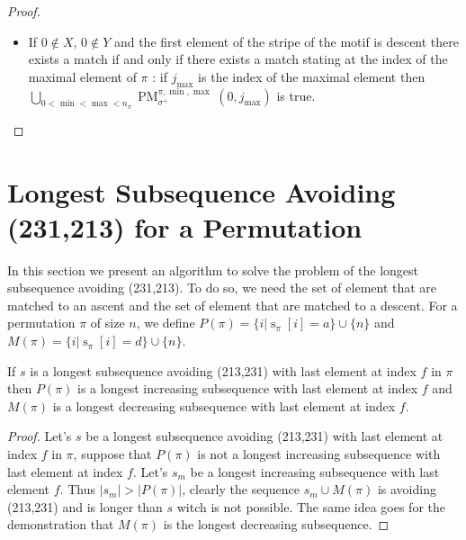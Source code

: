 \documentclass[a4paper]{llncs}
\newcommand{\ptext}{\pi}
\newcommand{\pmotif}{\sigma}
\DeclareMathOperator{\stripea}{s}
\newcommand{\stripe}[2]{\stripea_{{#1}}[{#2}]}
\newcommand{\dstep}{d}
\newcommand{\ustep}{a}
\newcommand{\x}{X}
\newcommand{\y}{Y}
\newcommand{\pbmotif}{\pmotif^+}
\DeclareMathOperator{\PMa}{PM}
\newcommand{\PM}[6]{\PMa_{{#1}}^{{#2},{#3},{#4}}({#5},{#6})}
\begin{document}
\begin{proof}
\begin{itemize}
	\item If $0 \notin \x$, $0 \notin \y$ and the first element of the stripe of the motif is descent there exists a match if and only if there exists a match stating at the index of the maximal element of $\ptext$ : if $j_{\max}$ is the index of the maximal element then  \\	$\bigcup_{0<\min<\max<n_\ptext}\PM{\pbmotif}{\ptext}{\min}{\max}{0}{j_{\max}}$ is true.	

\end{itemize}
\end{proof}



\section{Longest Subsequence Avoiding \\(231,213) for a Permutation}
\label{section:LCS}

	In this section we present an algorithm to solve the problem
	of the longest subsequence avoiding (231,213).
	To do so, we need the set of element
	that are matched to an ascent and the
	set of element that are matched to a descent.
	For a permutation $\pi$ of size $n$, we define
	$P(\pi) = \{i | \stripe{\pi}{i} = \ustep \} \cup \{n\}$ and
	$M(\pi) = \{i | \stripe{\pi}{i} = \dstep \} \cup \{n\}$.\\

	\begin{proposition}
	\label{proposition:longestIncreasingSubsequence}
	If $s$ is a longest subsequence avoiding (213,231) with last element at index $f$ in $\pi$ then
	$P(\pi)$ is a longest increasing subsequence with last element at index $f$ and
	$M(\pi)$ is a longest decreasing subsequence with last element at index $f$.
	\end{proposition}

	\begin{proof}
	Let's $s$ be a longest subsequence avoiding (213,231) with last element at index $f$ in $\pi$,
	suppose that $P(\pi)$ is not a longest increasing subsequence with last element at index $f$. Let's $s_m$ be a longest increasing subsequence with last element $f$.
	Thus $|s_m|>|P(\pi)|$, clearly the sequence $s_m \cup M(\pi)$
	is avoiding (213,231) and is longer than $s$ witch is not possible.
	The same idea goes for the demonstration that $M(\pi)$ is the longest decreasing subsequence.
	\end{proof}
\end{document}
